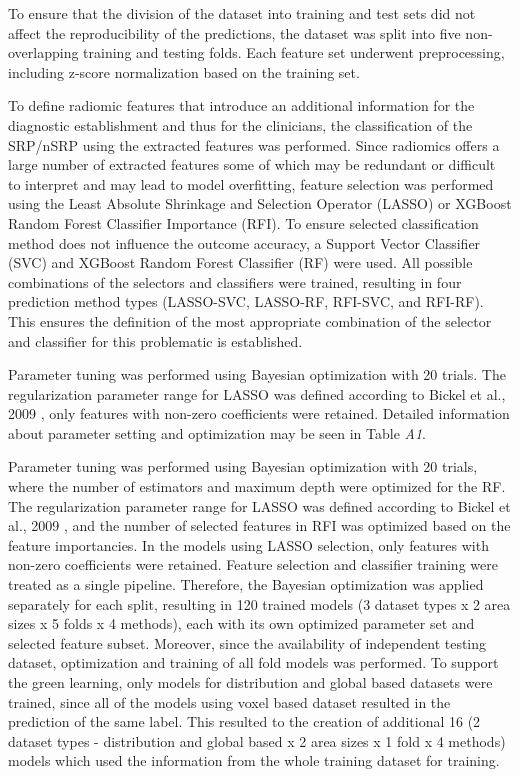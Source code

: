 \documentclass[preprint,12pt]{elsarticle}
\begin{document}
To ensure that the division of the dataset into training and test sets did not affect the reproducibility of the predictions, the dataset was split into five non-overlapping training and testing folds. Each feature set underwent preprocessing, including z-score normalization based on the training set. 

To define radiomic features that introduce an additional information for the diagnostic establishment and thus for the clinicians, the classification of the SRP/nSRP using the extracted features was performed. Since radiomics offers a large number of extracted features some of which may be redundant or difficult to interpret and may lead to model overfitting, feature selection was performed using the Least Absolute Shrinkage and Selection Operator (LASSO) or XGBoost Random Forest Classifier Importance (RFI). To ensure selected classification method does not influence the outcome accuracy, a Support Vector Classifier (SVC) and XGBoost Random Forest Classifier (RF) were used.  All possible combinations of the selectors and classifiers were trained, resulting in four prediction method types (LASSO-SVC, LASSO-RF, RFI-SVC, and RFI-RF). This ensures the definition of the most appropriate combination of the selector and classifier for this problematic is established. 

Parameter tuning was performed using Bayesian optimization with 20 trials. The regularization parameter range for LASSO was defined according to Bickel et al., 2009 \cite{Bickel200981}, only features with non-zero coefficients were retained. Detailed information about parameter setting and optimization may be seen in Table \textit{A1}. 


Parameter tuning was performed using Bayesian optimization with 20 trials, where the number of estimators and maximum depth were optimized for the RF. The regularization parameter range for LASSO was defined according to Bickel et al., 2009 \cite{Bickel200981}, and the number of selected features in RFI was optimized based on the feature importancies. In the models using LASSO selection, only features with non-zero coefficients were retained. Feature selection and classifier training were treated as a single pipeline. Therefore, the Bayesian optimization was applied separately for each split, resulting in 120 trained models (3 dataset types x 2 area sizes x 5 folds x 4 methods), each with its own optimized parameter set and selected feature subset. Moreover, since the availability of independent testing dataset, optimization and training of all fold models was performed. To support the green learning, only models for distribution and global based datasets were trained, since all of the models using voxel based dataset resulted in the prediction of the same label. This resulted to the creation of additional 16 (2 dataset types - distribution and global based x 2 area sizes x 1 fold x 4 methods) models which used the information from the whole training dataset for training.
\end{document}
